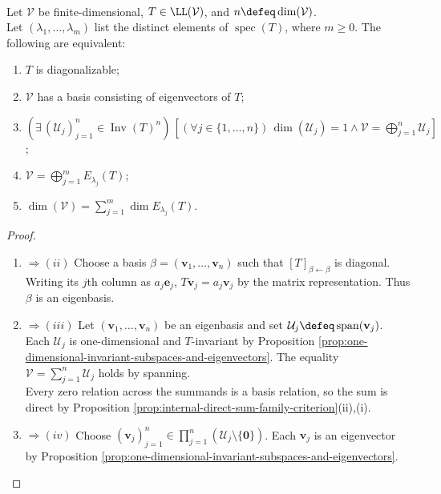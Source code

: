 \begin{theorem} \label{thm:conditions-equivalent-to-diagonalizability} \\
Let $\mathcal{V}$ be finite-dimensional, $T\in\LL(\mathcal{V})$, and $n\defeq\dim(\mathcal{V})$.\\
Let $(\lambda_1,\ldots,\lambda_m)$ list the distinct elements of $\operatorname{spec}(T)$, where $m\geq0$. The following are equivalent:
\begin{enumerate}[label=(\roman*)]
\setlength{\itemsep}{0pt}
\item $T$ is diagonalizable;
\item $\mathcal{V}$ has a basis consisting of eigenvectors of $T$;
\item $(\exists\,(\mathcal{U}_j)_{j=1}^{n}\in\operatorname{Inv}(T)^n)\,[(\forall j\in\{1,\ldots,n\})\,\dim(\mathcal{U}_j)=1\land\mathcal{V}=\bigoplus\limits_{j=1}^{n}\mathcal{U}_j]$;
\item $\mathcal{V}=\bigoplus\limits_{j=1}^{m}E_{\lambda_j}(T)$;
\item $\dim(\mathcal{V})=\sum\limits_{j=1}^{m}\dim E_{\lambda_j}(T)$.
\end{enumerate}
\begin{proof}
\begin{enumerate}[label=(\roman*)]
\setlength{\itemsep}{0pt}
\item[$(i)$] $\Rightarrow (ii)$ Choose a basis $\beta=(\mathbf{v}_1,\ldots,\mathbf{v}_n)$ such that $[T]_{\beta\leftarrow\beta}$ is diagonal.\\
Writing its $j$th column as $a_j\mathbf{e}_j$, $T\mathbf{v}_j=a_j\mathbf{v}_j$ by the matrix representation. Thus $\beta$ is an eigenbasis.
\item[$(ii)$] $\Rightarrow (iii)$ Let $(\mathbf{v}_1,\ldots,\mathbf{v}_n)$ be an eigenbasis and set $\mathcal{U}_j\defeq\operatorname{span}(\mathbf{v}_j)$.\\
Each $\mathcal{U}_j$ is one-dimensional and $T$-invariant by Proposition \ref{prop:one-dimensional-invariant-subspaces-and-eigenvectors}. The equality $\mathcal{V}=\sum\limits_{j=1}^{n}\mathcal{U}_j$ holds by spanning.\\
Every zero relation across the summands is a basis relation, so the sum is direct by Proposition \ref{prop:internal-direct-sum-family-criterion}(ii),(i).
\item[$(iii)$] $\Rightarrow (iv)$ Choose $(\mathbf{v}_j)_{j=1}^{n}\in\prod\limits_{j=1}^{n}(\mathcal{U}_j\setminus\{\mathbf{0}\})$. Each $\mathbf{v}_j$ is an eigenvector by Proposition \ref{prop:one-dimensional-invariant-subspaces-and-eigenvectors}.\\

\end{enumerate}
\end{proof}
\end{theorem}
